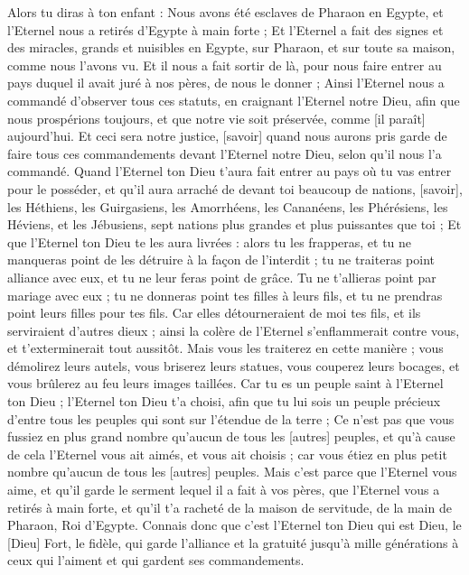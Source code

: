 \begin{multicols}{2}
Alors tu diras à ton enfant : Nous avons été esclaves de Pharaon en Egypte, et l'Eternel nous a retirés d'Egypte à main forte ;
Et l'Eternel a fait des signes et des miracles, grands et nuisibles en Egypte, sur Pharaon, et sur toute sa maison, comme nous l'avons vu.
Et il nous a fait sortir de là, pour nous faire entrer au pays duquel il avait juré à nos pères, de nous le donner ;
Ainsi l'Eternel nous a commandé d'observer tous ces statuts, en craignant l'Eternel notre Dieu, afin que nous prospérions toujours, et que notre vie soit préservée, comme [il paraît] aujourd'hui.
Et ceci sera notre justice, [savoir] quand nous aurons pris garde de faire tous ces commandements devant l'Eternel notre Dieu, selon qu'il nous l'a commandé.
\VerseOne{}Quand l'Eternel ton Dieu t'aura fait entrer au pays où tu vas entrer pour le posséder, et qu'il aura arraché de devant toi beaucoup de nations, [savoir], les Héthiens, les Guirgasiens, les Amorrhéens, les Cananéens, les Phérésiens, les Héviens, et les Jébusiens, sept nations plus grandes et plus puissantes que toi ;
Et que l'Eternel ton Dieu te les aura livrées : alors tu les frapperas, et tu ne manqueras point de les détruire à la façon de l'interdit ; tu ne traiteras point alliance avec eux, et tu ne leur feras point de grâce.
Tu ne t'allieras point par mariage avec eux ; tu ne donneras point tes filles à leurs fils, et tu ne prendras point leurs filles pour tes fils.
Car elles détourneraient de moi tes fils, et ils serviraient d'autres dieux ; ainsi la colère de l'Eternel s'enflammerait contre vous, et t'exterminerait tout aussitôt.
Mais vous les traiterez en cette manière ; vous démolirez leurs autels, vous briserez leurs statues, vous couperez leurs bocages, et vous brûlerez au feu leurs images taillées.
Car tu es un peuple saint à l'Eternel ton Dieu ; l'Eternel ton Dieu t'a choisi, afin que tu lui sois un peuple précieux d'entre tous les peuples qui sont sur l'étendue de la terre ;
Ce n'est pas que vous fussiez en plus grand nombre qu'aucun de tous les [autres] peuples, et qu'à cause de cela l'Eternel vous ait aimés, et vous ait choisis ; car vous étiez en plus petit nombre qu'aucun de tous les [autres] peuples.
Mais c'est parce que l'Eternel vous aime, et qu'il garde le serment lequel il a fait à vos pères, que l'Eternel vous a retirés à main forte, et qu'il t'a racheté de la maison de servitude, de la main de Pharaon, Roi d'Egypte.
Connais donc que c'est l'Eternel ton Dieu qui est Dieu, le [Dieu] Fort, le fidèle, qui garde l'alliance et la gratuité jusqu'à mille générations à ceux qui l'aiment et qui gardent ses commandements.

\end{multicols}
